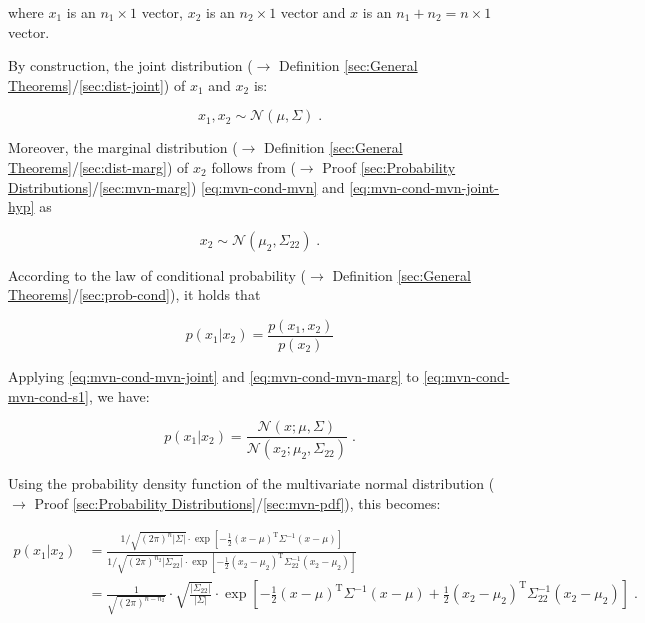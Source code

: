 \documentclass[a4paper,12pt,twoside]{book}
\begin{document}
where $x_1$ is an $n_1 \times 1$ vector, $x_2$ is an $n_2 \times 1$ vector and $x$ is an $n_1 + n_2 = n \times 1$ vector.

\vspace{1em}
By construction, the joint distribution ($\rightarrow$ Definition \ref{sec:General Theorems}/\ref{sec:dist-joint}) of $x_1$ and $x_2$ is:

\begin{equation} \label{eq:mvn-cond-mvn-joint}
x_1,x_2 \sim \mathcal{N}(\mu, \Sigma) \; .
\end{equation}

Moreover, the marginal distribution ($\rightarrow$ Definition \ref{sec:General Theorems}/\ref{sec:dist-marg}) of $x_2$ follows from ($\rightarrow$ Proof \ref{sec:Probability Distributions}/\ref{sec:mvn-marg}) \eqref{eq:mvn-cond-mvn} and \eqref{eq:mvn-cond-mvn-joint-hyp} as

\begin{equation} \label{eq:mvn-cond-mvn-marg}
x_2 \sim \mathcal{N}(\mu_2, \Sigma_{22}) \; .
\end{equation}

According to the law of conditional probability ($\rightarrow$ Definition \ref{sec:General Theorems}/\ref{sec:prob-cond}), it holds that

\begin{equation} \label{eq:mvn-cond-mvn-cond-s1}
p(x_1|x_2) = \frac{p(x_1,x_2)}{p(x_2)}
\end{equation}

Applying \eqref{eq:mvn-cond-mvn-joint} and \eqref{eq:mvn-cond-mvn-marg} to \eqref{eq:mvn-cond-mvn-cond-s1}, we have:

\begin{equation} \label{eq:mvn-cond-mvn-cond-s2}
p(x_1|x_2) = \frac{\mathcal{N}(x; \mu, \Sigma)}{\mathcal{N}(x_2; \mu_2, \Sigma_{22})} \; .
\end{equation}

Using the probability density function of the multivariate normal distribution ($\rightarrow$ Proof \ref{sec:Probability Distributions}/\ref{sec:mvn-pdf}), this becomes:

\begin{equation} \label{eq:mvn-cond-mvn-cond-s3}
\begin{split}
p(x_1|x_2) &= \frac{1/\sqrt{(2 \pi)^n |\Sigma|} \cdot \exp \left[ -\frac{1}{2} (x-\mu)^\mathrm{T} \Sigma^{-1} (x-\mu) \right]}{1/\sqrt{(2 \pi)^{n_2} |\Sigma_{22}|} \cdot \exp \left[ -\frac{1}{2} (x_2-\mu_2)^\mathrm{T} \Sigma_{22}^{-1} (x_2-\mu_2) \right]} \\
&= \frac{1}{\sqrt{(2 \pi)^{n-n_2}}} \cdot \sqrt{\frac{|\Sigma_{22}|}{|\Sigma|}} \cdot \exp \left[ -\frac{1}{2} (x-\mu)^\mathrm{T} \Sigma^{-1} (x-\mu) + \frac{1}{2} (x_2-\mu_2)^\mathrm{T} \Sigma_{22}^{-1} (x_2-\mu_2) \right] \; .
\end{split}
\end{equation}
\end{document}
